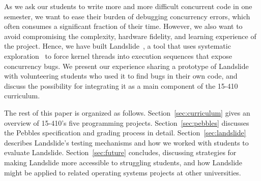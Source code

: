 As we ask our students to write more and more difficult concurrent code in one semester, we want to ease their burden of debugging concurrency errors, which often consumes a significant fraction of their time.
However, we also want to avoid compromising the complexity, hardware fidelity, and learning experience of the project.
Hence, we have built Landslide~\cite{landslide}, a tool that uses systematic exploration~\cite{verisoft} to force kernel threads into execution sequences that expose concurrency bugs.
We present our experience sharing a prototype of Landslide with volunteering students who used it to find bugs in their own code, and discuss the possibility for integrating it as a main component of the 15-410 curriculum.


The rest of this paper is organized as follows.
Section~\ref{sec:curriculum} gives an overview of 15-410's five programming projects.
Section~\ref{sec:pebbles} discusses the Pebbles specification and grading process in detail.
Section~\ref{sec:landslide} describes Landslide's testing mechanisms and how we worked with students to evaluate Landslide.
Section~\ref{sec:future} concludes, discussing strategies for making Landslide more accessible to struggling students, and how Landslide might be applied to related operating systems projects at other universities.
